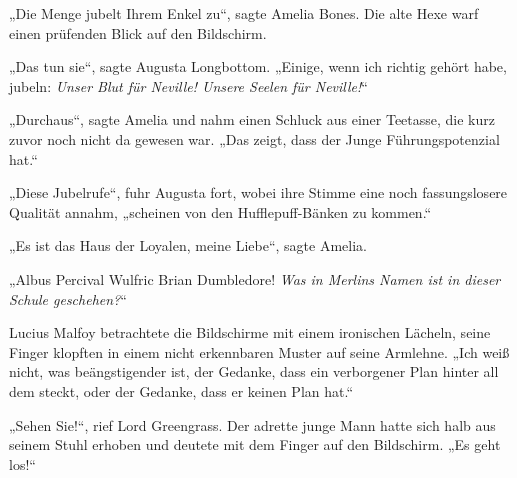„Die Menge jubelt Ihrem Enkel zu“, sagte Amelia Bones. Die alte Hexe warf einen prüfenden Blick auf den Bildschirm.

„Das tun sie“, sagte Augusta Longbottom. „Einige, wenn ich richtig gehört habe, jubeln: \emph{Unser Blut für Neville! Unsere Seelen für Neville!}“

„Durchaus“, sagte Amelia und nahm einen Schluck aus einer Teetasse, die kurz zuvor noch nicht da gewesen war. „Das zeigt, dass der Junge Führungspotenzial hat.“

„Diese Jubelrufe“, fuhr Augusta fort, wobei ihre Stimme eine noch fassungslosere Qualität annahm, „scheinen von den Hufflepuff-Bänken zu kommen.“

„Es ist das Haus der Loyalen, meine Liebe“, sagte Amelia.

„Albus Percival Wulfric Brian Dumbledore! \emph{Was in Merlins Namen ist in dieser Schule geschehen?}“

Lucius Malfoy betrachtete die Bildschirme mit einem ironischen Lächeln, seine Finger klopften in einem nicht erkennbaren Muster auf seine Armlehne. „Ich weiß nicht, was beängstigender ist, der Gedanke, dass ein verborgener Plan hinter all dem steckt, oder der Gedanke, dass er keinen Plan hat.“

„Sehen Sie!“, rief Lord Greengrass. Der adrette junge Mann hatte sich halb aus seinem Stuhl erhoben und deutete mit dem Finger auf den Bildschirm. „Es geht los!“

